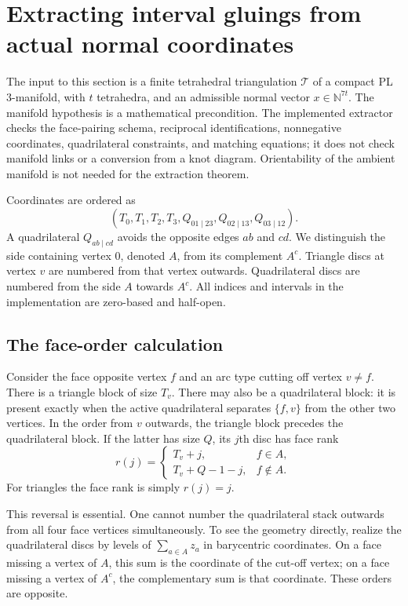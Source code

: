 \section{Extracting interval gluings from actual normal coordinates}
\label{sec:normal-interval-extraction}

The input to this section is a finite tetrahedral triangulation
$\mathcal T$ of a compact PL $3$-manifold, with $t$ tetrahedra, and an
admissible normal vector $x\in\mathbb N^{7t}$. The manifold hypothesis is
a mathematical precondition. The implemented extractor checks the face-pairing
schema, reciprocal identifications, nonnegative coordinates, quadrilateral
constraints, and matching equations; it does not check manifold links or a
conversion from a knot diagram. Orientability of the ambient manifold is not
needed for the extraction theorem.

Coordinates are ordered as
\[
 (T_0,T_1,T_2,T_3,Q_{01\mid23},Q_{02\mid13},Q_{03\mid12}).
\]
A quadrilateral $Q_{ab\mid cd}$ avoids the opposite edges $ab$ and $cd$.
We distinguish the side containing vertex $0$, denoted $A$, from its
complement $A^c$. Triangle discs at vertex $v$ are numbered from that vertex
outwards. Quadrilateral discs are numbered from the side $A$ towards $A^c$.
All indices and intervals in the implementation are zero-based and half-open.

\subsection{The face-order calculation}

Consider the face opposite vertex $f$ and an arc type cutting off vertex
$v\ne f$. There is a triangle block of size $T_v$. There may also be a
quadrilateral block: it is present exactly when the active quadrilateral
separates $\{f,v\}$ from the other two vertices. In the order from $v$
outwards, the triangle block precedes the quadrilateral block. If the latter
has size $Q$, its $j$th disc has face rank
\begin{equation}
 r(j)=
 \begin{cases}
  T_v+j,& f\in A,\\
  T_v+Q-1-j,& f\notin A.
 \end{cases}
 \label{eq:normal-face-rank}
\end{equation}
For triangles the face rank is simply $r(j)=j$.

This reversal is essential. One cannot number the quadrilateral stack
outwards from all four face vertices simultaneously. To see the geometry
directly, realize the quadrilateral discs by levels of
$\sum_{a\in A}z_a$ in barycentric coordinates. On a face missing a vertex of
$A$, this sum is the coordinate of the cut-off vertex; on a face missing a
vertex of $A^c$, the complementary sum is that coordinate. These orders
are opposite.

